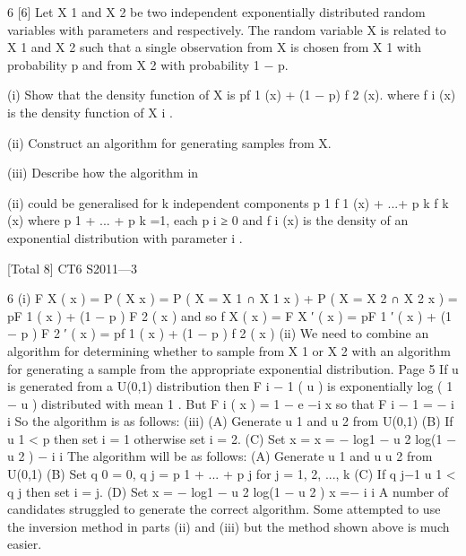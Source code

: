 \documentclass[a4paper,12pt]{article}
\begin{document}
6
[6]
Let X 1 and X 2 be two independent exponentially distributed random variables with
parameters  and  respectively. The random variable X is related to X 1 and X 2
such that a single observation from X is chosen from X 1 with probability p and from
X 2 with probability 1 − p.
\item (i)
Show that the density function of X is
pf 1 (x) + (1 − p) f 2 (x).
where f i (x) is the density function of X i . 
\item (ii) Construct an algorithm for generating samples from X. 
\item (iii) Describe how the algorithm in \item (ii) could be generalised for k independent
components p 1 f 1 (x) + ...+ p k f k (x) where p 1 + ... + p k =1, each p i ≥ 0 and f i (x)
is the density of an exponential distribution with parameter \lambda  i .

[Total 8]
CT6 S2011—3


6
(i)
F X ( x ) = P ( X \leq  x ) = P ( X = X 1 ∩ X 1 \leq  x ) + P ( X = X 2 ∩ X 2 \leq  x )
= pF 1 ( x ) + (1 − p ) F 2 ( x )
and so f X ( x ) = F X ′ ( x ) = pF 1 ′ ( x ) + (1 − p ) F 2 ′ ( x ) = pf 1 ( x ) + (1 − p ) f 2 ( x )
(ii)
We need to combine an algorithm for determining whether to sample from X 1
or X 2 with an algorithm for generating a sample from the appropriate
exponential distribution.
Page 5%
If u is generated from a U(0,1) distribution then F i − 1 ( u ) is exponentially
log ( 1 − u )
distributed with mean 1 . But F i ( x ) = 1 − e −\lambda  i x so that F i − 1 = −
\lambda  i
\lambda 
i
So the algorithm is as follows:
(iii)
(A) Generate u 1 and u 2 from U(0,1)
(B) If u 1 < p then set i = 1 otherwise set i = 2.
(C) Set x = x = −
log1 − u 2 log(1 − u 2 )
−
\lambda  i
\lambda  i
The algorithm will be as follows:
(A) Generate u 1 and u u 2 from U(0,1)
(B) Set q 0 = 0, q j = p 1 + ... + p j for j = 1, 2, ..., k
(C) If q j−1 \leq  u 1 < q j then set i = j.
(D) Set x = −
log1 − u 2
log(1 − u 2 )
x =−
\lambda  i
\lambda  i
A number of candidates struggled to generate the correct algorithm. Some attempted to use
the inversion method in parts (ii) and (iii) but the method shown above is much easier.
\end{document}
